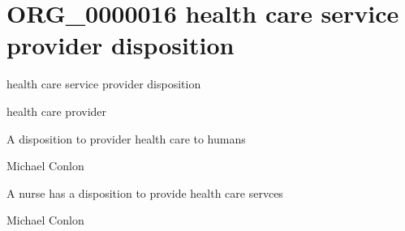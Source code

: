 \documentclass[letterpaper,10pt,english]{sphinxmanual}
\begin{document}
\section{ORG\_0000016 \sphinxhyphen{} health care service provider disposition}
\label{\detokenize{doc-ORG_0000016:org-0000016-health-care-service-provider-disposition}}\label{\detokenize{doc-ORG_0000016:index-0}}\label{\detokenize{doc-ORG_0000016::doc}}
\begin{sphinxShadowBox}

\sphinxAtStartPar
health care service provider disposition
\end{sphinxShadowBox}

\begin{sphinxShadowBox}

\sphinxAtStartPar
health care provider
\end{sphinxShadowBox}

\begin{sphinxShadowBox}

\sphinxAtStartPar
A disposition to provider health care to humans
\end{sphinxShadowBox}

\begin{sphinxShadowBox}

\sphinxAtStartPar
Michael Conlon 
\end{sphinxShadowBox}

\begin{sphinxShadowBox}

\sphinxAtStartPar
A nurse has a disposition to provide health care servces
\end{sphinxShadowBox}

\begin{sphinxShadowBox}

\sphinxAtStartPar
Michael Conlon 
\end{sphinxShadowBox}
\begin{quote}
\label{\detokenize{doc-ORG_0000017:org-0000017}}\label{\detokenize{doc-ORG_0000017:hospital-service-provider-disposition}}\label{\detokenize{doc-ORG_0000017:org-0000017}}
\ignorespaces \end{quote}
\end{document}
